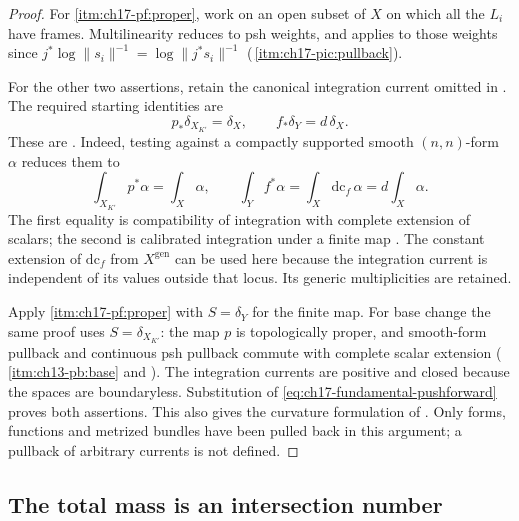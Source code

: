 \begin{proof}
For \cref{itm:ch17-pf:proper}, work on an open subset of $X$ on which
all the $L_i$ have frames.  Multilinearity reduces to psh weights,
and  applies to those weights since
$j^*\log\|s_i\|^{-1}=\log\|j^*s_i\|^{-1}$
(\,\cref{itm:ch17-pic:pullback}).

For the other two assertions, retain the canonical integration current
omitted in .  The required starting identities
are
\begin{equation}
\label{eq:ch17-fundamental-pushforward}
              p_*\delta_{X_{K'}}=\delta_X,
              \qquad f_*\delta_Y=d\,\delta_X .
\end{equation}
These are \cite[Propositions~16.1.1--16.1.2]{CLD25}.
Indeed, testing against a compactly supported smooth $(n,n)$-form
$\alpha$ reduces them to
\[
       \int_{X_{K'}}p^*\alpha=\int_X\alpha,
       \qquad
       \int_Y f^*\alpha=\int_X\mathrm{dc}_f\,\alpha
                       =d\int_X\alpha .
\]
The first equality is compatibility of integration with complete
extension of scalars; the second is calibrated integration under a
finite map \cite[Propositions~15.3.1 and 15.4.3]{CLD25}.
The constant extension of $\mathrm{dc}_f$ from $X^{\mathrm{gen}}$
can be used here because the integration current is independent of
its values outside that locus.  Its generic multiplicities are retained.

Apply \cref{itm:ch17-pf:proper} with $S=\delta_Y$ for the finite map.
For base change the same proof uses $S=\delta_{X_{K'}}$:
the map $p$ is topologically proper, and smooth-form pullback and
continuous psh pullback commute with complete scalar extension
(\,\cref{itm:ch13-pb:base} and
).  The integration currents are positive
and closed because the spaces are boundaryless.  Substitution of
\eqref{eq:ch17-fundamental-pushforward} proves both assertions.
This also gives the curvature formulation of
\cite[Corollary~18.3.3]{CLD25}.  Only forms, functions and metrized
bundles have been pulled back in this argument; a pullback of
arbitrary currents is not defined.
\end{proof}

\subsection{The total mass is an intersection number}
\label{sec:ch17-degree}

